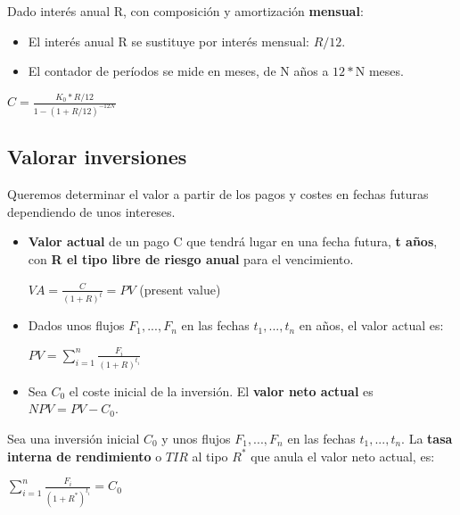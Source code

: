 \documentclass[
10pt, %
a4paper, %
oneside, %
headinclude,footinclude, %
BCOR5mm, %
]{scrartcl}
\newcommand{\n}[1]{\textbf{#1}}
\newcommand{\sub}[1]{_{#1}}
\newcommand{\pot}[1]{^{#1}}
\newcommand{\f}[1]{{\large{${#1}$}}}
\newcommand{\sumatorio}[2]{\sum_{#1}^{#2}}
\newcounter{ex}
\begin{document}
		Dado interés anual R, con composición y amortización \n{mensual}:
		\begin{itemize}
			\item El interés anual R se sustituye por interés mensual: \f{R/12}.
			\item El contador de períodos se mide en meses, de N años a \f{12*}N meses.
		\end{itemize}
		\begin{center} \f{C = \frac{K\sub{0} * R/12}{1 - (1 + R/12)\pot{-12N}}} \end{center}

	\subsection{Valorar inversiones}

		Queremos determinar el valor a partir de los pagos y costes en fechas futuras dependiendo de unos intereses.

		\begin{itemize} 
			\item \n{Valor actual} de un pago C que tendrá lugar en una fecha futura, \n{t años}, con \n{R el tipo libre de riesgo anual} para el vencimiento.
			\begin{center} \f{VA = \frac{C}{(1+R)\pot{t}} = PV} (present value) \end{center}

			\item Dados unos flujos \f{F\sub{1},...,F\sub{n}} en las fechas \f{t\sub{1},...,t\sub{n}} en años, el valor actual es:
			\begin{center} \f{PV = \sumatorio{i=1}{n} \frac{F\sub{i}}{(1+R)\pot{t\sub{i}}}} \end{center}

			\item Sea \f{C\sub{0}} el coste inicial de la inversión. El \n{valor neto actual} es \f{NPV = PV - C\sub{0}}.
		\end{itemize}

		Sea una inversión inicial \f{C\sub{0}} y unos flujos \f{F\sub{1},...,F\sub{n}} en las fechas \f{t\sub{1},...,t\sub{n}}. La \n{tasa interna de rendimiento} o \f{TIR} al tipo \f{R\pot{*}} que anula el valor neto actual, es: 
		\begin{center} \f{\sumatorio{i=1}{n} \frac{F\sub{i}}{(1+R\pot{*})\pot{t\sub{i}}} = C\sub{0}} \end{center}
\end{document}
